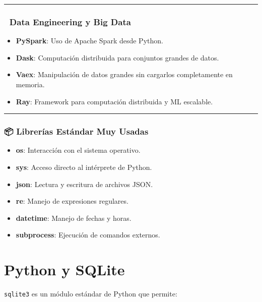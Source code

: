 \documentclass[
]{book}
\providecommand{\tightlist}{%
  \setlength{\itemsep}{0pt}\setlength{\parskip}{0pt}}
\theoremstyle{break}
\theoremstyle{nonumberplain}
\begin{document}
\begin{center}\rule{0.5\linewidth}{0.5pt}\end{center}

\subsubsection{🧪 Data Engineering y Big Data}\label{data-engineering-y-big-data}

\begin{itemize}
\tightlist
\item
  \textbf{PySpark}: Uso de Apache Spark desde Python.
\item
  \textbf{Dask}: Computación distribuida para conjuntos grandes de datos.
\item
  \textbf{Vaex}: Manipulación de datos grandes sin cargarlos completamente en memoria.
\item
  \textbf{Ray}: Framework para computación distribuida y ML escalable.
\end{itemize}

\begin{center}\rule{0.5\linewidth}{0.5pt}\end{center}

\subsubsection{📦 Librerías Estándar Muy Usadas}\label{libreruxedas-estuxe1ndar-muy-usadas}

\begin{itemize}
\tightlist
\item
  \textbf{os}: Interacción con el sistema operativo.
\item
  \textbf{sys}: Acceso directo al intérprete de Python.
\item
  \textbf{json}: Lectura y escritura de archivos JSON.
\item
  \textbf{re}: Manejo de expresiones regulares.
\item
  \textbf{datetime}: Manejo de fechas y horas.
\item
  \textbf{subprocess}: Ejecución de comandos externos.
\end{itemize}

\section{Python y SQLite}\label{python-y-sqlite}

\texttt{sqlite3} es un módulo estándar de Python que permite:
\end{document}
